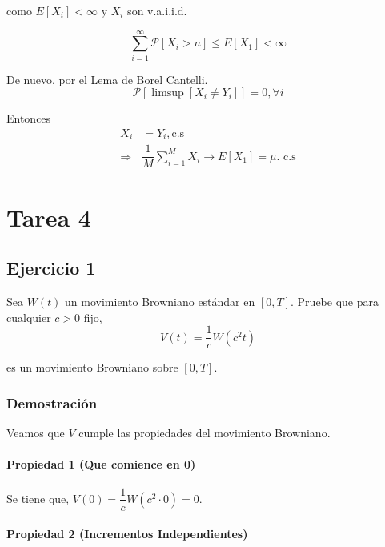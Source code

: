\documentclass[
  letterpaper,
  DIV=11,
  numbers=noendperiod]{scrreprt}
\begin{document}
como \(E\left[X_{i}\right]<\infty\) y \(X_{i}\) son v.a.i.i.d.

\[
\sum_{i=1}^{\infty}\mathcal{P}\left[X_{i}>n\right]\leq E\left[X_{1}\right]<\infty
\]

De nuevo, por el Lema de Borel Cantelli. \[
\mathcal{P}\left[\limsup\left[X_{i}\neq Y_{i}\right]\right]=0,\forall i
\]

Entonces \begin{align*}
X_{i} & =Y_{i},\text{c.s}\\
\Rightarrow & \dfrac{1}{M}\sum_{i=1}^{M}X_{i}\to E\left[X_{1}\right]=\mu.\text{ c.s}
\end{align*}


\hypertarget{tarea-4}{%
\chapter{Tarea 4}\label{tarea-4}}

\hypertarget{ejercicio-1}{%
\section{Ejercicio 1}\label{ejercicio-1}}

Sea \(W(t)\) un movimiento Browniano estándar en \([0,T]\). Pruebe que
para cualquier \(c>0\) fijo, \[
V(t) = \dfrac{1}{c} W(c^2 t)
\]

es un movimiento Browniano sobre \([0,T]\).

\hypertarget{demostraciuxf3n}{%
\subsection{Demostración}\label{demostraciuxf3n}}

Veamos que \(V\) cumple las propiedades del movimiento Browniano.

\hypertarget{propiedad-1-que-comience-en-0}{%
\subsubsection{Propiedad 1 (Que comience en
0)}\label{propiedad-1-que-comience-en-0}}

Se tiene que, \(V(0) = \dfrac{1}{c} W (c^2\cdot0)=0\).

\hypertarget{propiedad-2-incrementos-independientes}{%
\subsubsection{Propiedad 2 (Incrementos
Independientes)}\label{propiedad-2-incrementos-independientes}}
\end{document}
